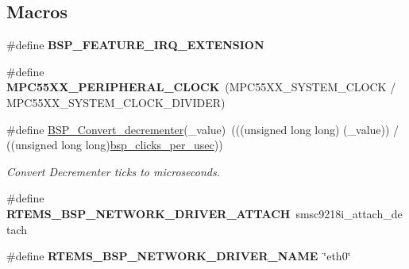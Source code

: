 \subsection*{Macros}
\begin{DoxyCompactItemize}
\item 
\mbox{\label{group__RTEMSBSPsPowerPCMPC55XX_ga5d7d631d3a14b7554160f14eb42f351b}} 
\#define {\bfseries B\+S\+P\+\_\+\+F\+E\+A\+T\+U\+R\+E\+\_\+\+I\+R\+Q\+\_\+\+E\+X\+T\+E\+N\+S\+I\+ON}
\item 
\mbox{\label{group__RTEMSBSPsPowerPCMPC55XX_ga51d0f3a059b2d9a6aa154a085ffb26f7}} 
\#define {\bfseries M\+P\+C55\+X\+X\+\_\+\+P\+E\+R\+I\+P\+H\+E\+R\+A\+L\+\_\+\+C\+L\+O\+CK}~(M\+P\+C55\+X\+X\+\_\+\+S\+Y\+S\+T\+E\+M\+\_\+\+C\+L\+O\+CK / M\+P\+C55\+X\+X\+\_\+\+S\+Y\+S\+T\+E\+M\+\_\+\+C\+L\+O\+C\+K\+\_\+\+D\+I\+V\+I\+D\+ER)
\item 
\mbox{\label{group__RTEMSBSPsPowerPCMPC55XX_ga5b3b7a8f2f89a6110c93e0229f67c104}} 
\#define \mbox{\hyperlink{group__RTEMSBSPsPowerPCMPC55XX_ga5b3b7a8f2f89a6110c93e0229f67c104}{B\+S\+P\+\_\+\+Convert\+\_\+decrementer}}(\+\_\+value)~(((unsigned long long) (\+\_\+value)) / ((unsigned long long)\mbox{\hyperlink{group__RTEMSBSPsPowerPCGen83XX_gabfae404b02d5b3193b9420930d97d84a}{bsp\+\_\+clicks\+\_\+per\+\_\+usec}}))
\begin{DoxyCompactList}\small\item\em Convert Decrementer ticks to microseconds. \end{DoxyCompactList}\item 
\mbox{\label{group__RTEMSBSPsPowerPCMPC55XX_gadde0d66aef9442971dde465292ac14e6}} 
\#define {\bfseries R\+T\+E\+M\+S\+\_\+\+B\+S\+P\+\_\+\+N\+E\+T\+W\+O\+R\+K\+\_\+\+D\+R\+I\+V\+E\+R\+\_\+\+A\+T\+T\+A\+CH}~smsc9218i\+\_\+attach\+\_\+detach
\item 
\mbox{\label{group__RTEMSBSPsPowerPCMPC55XX_ga86d4f9aa98431100692e31068070a8df}} 
\#define {\bfseries R\+T\+E\+M\+S\+\_\+\+B\+S\+P\+\_\+\+N\+E\+T\+W\+O\+R\+K\+\_\+\+D\+R\+I\+V\+E\+R\+\_\+\+N\+A\+ME}~\char`\"{}eth0\char`\"{}
\item 
\mbox{\label{group__RTEMSBSPsPowerPCMPC55XX_ga4aa606d0badadcc28e8054cb60f13b56}} 

\end{DoxyCompactItemize}

